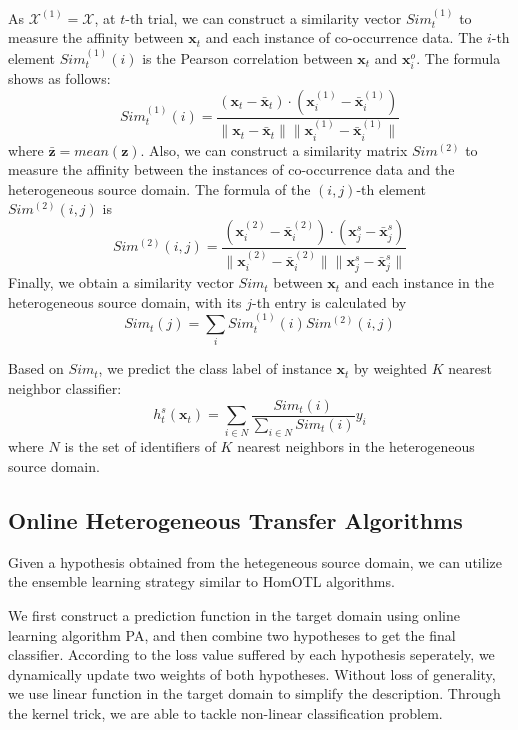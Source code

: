 \documentclass[letterpaper]{article}
\theoremstyle{remark}
\theoremstyle{definition}
\begin{document}
As $\mathcal{X}^{(1)} = \mathcal{X}$, at $t$-th trial, we can construct a similarity vector $Sim_{t}^{(1)}$ to measure the affinity between $\mathbf{x}_t$ and each instance of co-occurrence data. 
The $i$-th element $Sim_{t}^{(1)}(i)$ is the Pearson correlation between $\mathbf{x}_t$ and $\mathbf{x}_{i}^{o}$.
The formula shows as follows:
$$ Sim_{t}^{(1)}(i) = \frac{(\mathbf{x}_t - \bar{\mathbf{x}}_t) \cdot (\mathbf{x}_{i}^{(1)} - \bar{\mathbf{x}}_{i}^{(1)})}{\| \mathbf{x}_t - \bar{\mathbf{x}}_t \| \| \mathbf{x}_{i}^{(1)} - \bar{\mathbf{x}}_{i}^{(1)} \|} $$
where $\bar{\mathbf{z}} = mean(\mathbf{z})$.
Also, we can construct a similarity matrix $Sim^{(2)}$ to measure the affinity between the instances of co-occurrence data and the heterogeneous source domain.
The formula of the $(i,j)$-th element $Sim^{(2)}(i,j)$ is
$$ Sim^{(2)}(i,j) = \frac{(\mathbf{x}_{i}^{(2)} - \bar{\mathbf{x}}_{i}^{(2)}) \cdot (\mathbf{x}_{j}^{s} - \bar{\mathbf{x}}_{j}^{s})}{\| \mathbf{x}_{i}^{(2)} - \bar{\mathbf{x}}_{i}^{(2)} \| \| \mathbf{x}_{j}^{s} - \bar{\mathbf{x}}_{j}^{s} \|} $$
Finally, we obtain a similarity vector $Sim_t$ between $\mathbf{x}_t$ and each instance in the heterogeneous source domain, with its $j$-th entry is calculated by 
$$ Sim_t(j) = \sum\limits_i Sim_{t}^{(1)}(i) Sim^{(2)}(i,j) $$

Based on $Sim_t$, we predict the class label of instance $\mathbf{x}_t$ by weighted $K$ nearest neighbor classifier:
$$ h_{t}^{s}(\mathbf{x}_t) = \sum\limits_{i \in N} \frac{Sim_t(i)}{\sum\limits_{i \in N} Sim_t(i)} y_i $$
where $N$ is the set of identifiers of $K$ nearest neighbors in the heterogeneous source domain.

\subsection{Online Heterogeneous Transfer Algorithms}

Given a hypothesis obtained from the hetegeneous source domain, we can utilize the ensemble learning strategy similar to HomOTL algorithms.

We first construct a prediction function in the target domain using online learning algorithm PA, and then combine two hypotheses to get the final classifier.
According to the loss value suffered by each hypothesis seperately, we dynamically update two weights of both hypotheses.
Without loss of generality, we use linear function in the target domain to simplify the description.
Through the kernel trick, we are able to tackle non-linear classification problem.
\end{document}
